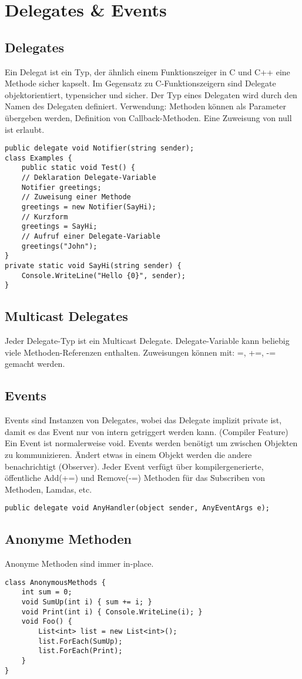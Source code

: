 \section{Delegates \& Events}
\subsection{Delegates}
Ein Delegat ist ein Typ, der ähnlich einem Funktionszeiger in C und C++ eine Methode sicher kapselt. Im Gegensatz zu C-Funktionszeigern sind Delegate objektorientiert, typensicher und sicher. Der Typ eines Delegaten wird durch den Namen des Delegaten definiert. Verwendung: Methoden können als Parameter übergeben werden, Definition von Callback-Methoden. Eine Zuweisung von null ist erlaubt.
\begin{lstlisting}
public delegate void Notifier(string sender);
class Examples {
	public static void Test() {
	// Deklaration Delegate-Variable 
	Notifier greetings; 
	// Zuweisung einer Methode 
	greetings = new Notifier(SayHi); 
	// Kurzform 
	greetings = SayHi; 
	// Aufruf einer Delegate-Variable 
	greetings("John");
}
private static void SayHi(string sender) {
	Console.WriteLine("Hello {0}", sender);
}
\end{lstlisting}

\subsection{Multicast Delegates}
Jeder Delegate-Typ ist ein Multicast Delegate. Delegate-Variable kann beliebig viele Methoden-Referenzen enthalten. Zuweisungen können mit: =, +=, -= gemacht werden.

\subsection{Events}
Events sind Instanzen von Delegates, wobei das Delegate implizit private ist, damit es das Event nur von intern getriggert werden kann. (Compiler Feature) Ein Event ist normalerweise void. Events werden benötigt um zwischen Objekten zu kommunizieren. Ändert etwas in einem Objekt werden die andere benachrichtigt (Observer). Jeder Event verfügt über kompilergenerierte, öffentliche Add(+=) und Remove(-=) Methoden für das Subscriben von Methoden, Lamdas, etc.
\begin{lstlisting}
public delegate void AnyHandler(object sender, AnyEventArgs e);
\end{lstlisting}

\subsection{Anonyme Methoden}
Anonyme Methoden sind immer in-place.
\begin{lstlisting}
class AnonymousMethods {
	int sum = 0; 
	void SumUp(int i) { sum += i; } 
	void Print(int i) { Console.WriteLine(i); } 
	void Foo() {
		List<int> list = new List<int>(); 
		list.ForEach(SumUp); 
		list.ForEach(Print);
	}	
}
\end{lstlisting}

\pagebreak











